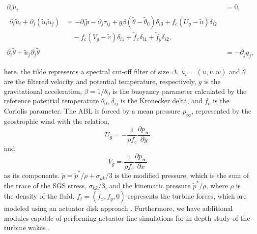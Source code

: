 \documentclass[output=paper,colorlinks,citecolor=brown]{langscibook}
\begin{document}
\begin{align}
 \partial_{\mathit{i}} \widetilde{u}_\mathit{i}&=0,\label{eqn2.1}\\
 \begin{split}
 \partial_{\mathit{t}}\widetilde{u}_\mathit{i} + \partial_\mathit{j}\left(\widetilde{u}_\mathit{i}\widetilde{u}_\mathit{j}\right)&=-\partial_{\mathit{i}}\widetilde{p}-\partial_\mathit{j}\tau_{\mathit{ij}} + g\beta(\widetilde{\theta}-\widetilde{\theta}_\mathit{0})\delta_{\mathit{i3}}+f_c(U_g-\widetilde{u})\delta_{i2}\\&\quad-f_c(V_g-\widetilde{v})\delta_{i1}+ \widetilde{f}_x\delta_{i1}+ \widetilde{f}_y\delta_{i2},
 \end{split}\label{eqn2.2}\\
 \partial_{\mathit{t}}\widetilde{\theta} + \widetilde{u}_\mathit{j}\partial_{\mathit{j}}\widetilde{\theta}&=-\partial_{\mathit{j}}q_\mathit{j},\label{eqn2.3}
\end{align}

here, the tilde represents a spectral cut-off filter of size $\Delta$, $\widetilde{u}_\mathit{i}=\left(\widetilde{u},\widetilde{v},\widetilde{w}\right)$ and $\widetilde{\theta}$ are the filtered velocity and potential temperature, respectively, $g$ is the gravitational acceleration, $\beta=1/\theta_\mathit{0}$ is the buoyancy parameter calculated by the reference potential temperature $\theta_\mathit{0}$, $\delta_{\mathit{ij}}$ is the Kronecker delta, and $f_c$ is the Coriolis parameter. The ABL is forced by a mean pressure $p_\infty$, represented by the geostrophic wind with the relation,
%
\begin{equation}
U_g=-\frac{1}{{\rho}f_c}\frac{\partial{p_{\infty}}}{\partial{y}} \end{equation}
%
and\\
\begin{equation}
V_g=\frac{1}{{\rho}f_c}\frac{\partial{p_{\infty}}}{\partial{x}}
\end{equation}
%
as its components. $\widetilde{p}=\widetilde{p}^{*}/\rho+\sigma_{kk}/3$ is the modified pressure, which is the sum of the trace of the SGS stress, $\sigma_{kk}/3$, and the kinematic pressure $\widetilde{p}^{*}/\rho$, where $\rho$ is the density of the fluid. $\widetilde{f}_i=(\widetilde{f}_x,\widetilde{f}_y,0)$ represents the turbine forces, which are modeled using an actuator disk approach \citep{jim10, cal10, cal11}. Furthermore, we have additional modules capable of performing actuator line simulations for in-depth study of the turbine wakes \citep{tro10,tro11}.\\
\end{document}
